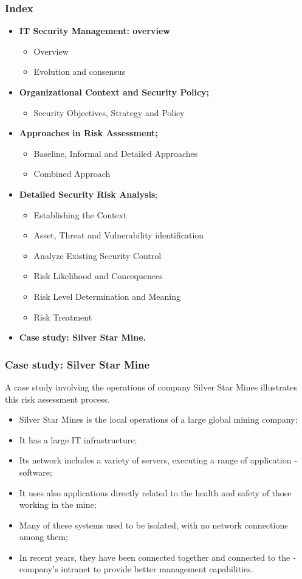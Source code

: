 \documentclass[xcolor ={table,usenames,dvipsnames}]{beamer}
\theoremstyle{definition}
\begin{document}
	\begin{frame}
		\frametitle{Index}
		\begin{itemize}
			\item <0> \textbf{IT Security Management: overview}
			\begin{itemize}
				\item Overview
				\item Evolution and consensus
			\end{itemize}
			\item <0>  \textbf{Organizational Context and Security Policy;}
			\begin{itemize}
				\item Security Objectives, Strategy and Policy
			\end{itemize}
			\item <0>  \textbf{Approaches in Risk Assessment;}
			\begin{itemize}
				\item Baseline, Informal and Detailed Approaches
				\item Combined Approach
			\end{itemize}
			\item <0> \textbf{Detailed Security Risk Analysis};
			\begin{itemize}
				\item Establishing the Context
				\item Asset, Threat and Vulnerability identification
				\item Analyze Existing Security Control
				\item Risk Likelihood and Concequences
				\item Risk Level Determination and Meaning
				\item Risk Treatment
			\end{itemize}
			\item <1> \textbf{Case study: Silver Star Mine.}
		\end{itemize}
	\end{frame}
	
	\begin{frame}
		\frametitle{Case study: Silver Star Mine}
		A case study involving the operations of  company Silver Star Mines illustrates this risk assessment process. 
		\begin{itemize}
			\item Silver Star Mines is the local operations of a large global
			mining company;
			\item It has a large IT infrastructure;
			\item Its network includes a variety of servers, executing a range of ­application ­software;
			\item It uses also applications directly related to the health and safety of those working in the mine;
			\item Many of these systems used to be isolated, with no network connections among them;
			\item In recent years, they have been connected together and connected to the ­company’s intranet to provide better management capabilities. 
		\end{itemize}
	\end{frame}
\end{document}

